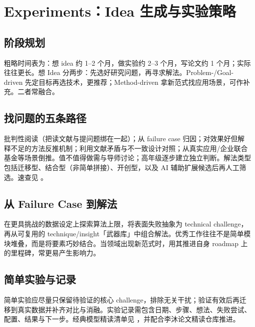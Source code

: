 ﻿\section{Experiments：Idea 生成与实验策略}
\label{sec:exp}


\subsection{阶段规划}
粗略时间表为：想 idea 约 1--2 个月，做实验约 2--3 个月，写论文约 1 个月；实际往往更长。想 Idea 分两步：先选好研究问题，再寻求解法。Problem-/Goal-driven 先定目标再选技术，更推荐；Method-driven 拿新范式找应用场景，可作补充。二者常融合。

\subsection{找问题的五条路径}
批判性阅读（把读文献与提问题绑在一起）；从 failure case 归因；对效果好但解释不足的方法反推机制；利用文献矛盾与不一致设计对照；从真实应用/企业联合基金等场景倒推。值不值得做需与导师讨论；高年级逐步建立独立判断。解法类型包括迁移型、结合型（非简单拼接）、开创型，以及 AI 辅助扩展候选后再人工筛选。速查见 。

\subsection{从 Failure Case 到解法}
在更具挑战的数据设定上探索算法上限，将表面失败抽象为 technical challenge，再从可复用的 technique/insight「武器库」中组合解法。优秀工作往往不是简单模块堆叠，而是将要素巧妙结合。当领域出现新范式时，用其推进自身 roadmap 上的里程碑，常更易产生影响力。

\subsection{简单实验与记录}
简单实验应尽量只保留待验证的核心 challenge，排除无关干扰；验证有效后再迁移到真实数据并补齐对比与消融。实验记录需包含日期、步骤、想法、失败尝试、配置、结果与下一步。经典模型精读清单见 ，并配合李沐论文精读仓库推进。
